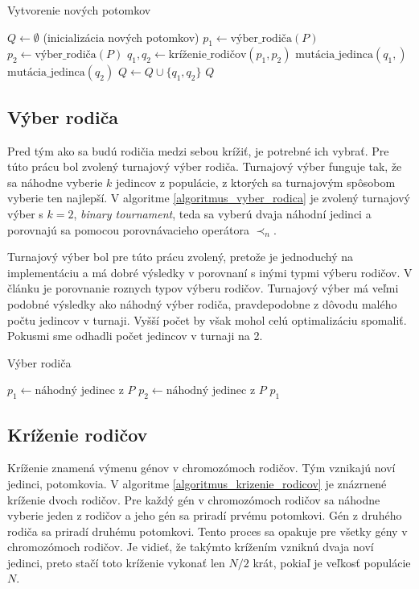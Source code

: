 \vspace*{\dimexpr 0.5\baselineskip\relax}
\begin{algorithm}[h]
\caption{Vytvorenie nových potomkov}
\label{algoritmus_vytvorenie_novych_potomkov}
  $Q \gets \emptyset$ (inicializácia nových potomkov)\;
   {
    $p_1 \gets \text{výber\_rodiča}(P)$\;
    $p_2 \gets \text{výber\_rodiča}(P)$\;
    $q_1, q_2 \gets \text{kríženie\_rodičov}(p_1, p_2)$\;
    $\text{mutácia\_jedinca}(q_1,)$\;
    $\text{mutácia\_jedinca}(q_2)$\;
    $Q \gets Q \cup \{q_1, q_2\}$\;
  }
  \Return $Q$\;
\end{algorithm}

\subsection*{Výber rodiča}
Pred tým ako sa budú rodičia medzi sebou krížiť, je potrebné ich vybrať.
Pre túto prácu bol zvolený turnajový výber rodiča.
Turnajový výber funguje tak, že sa náhodne vyberie $k$ jedincov z populácie, z ktorých sa turnajovým spôsobom vyberie ten najlepší.
V algoritme \ref{algoritmus_vyber_rodica} je zvolený turnajový výber s $k = 2$, \textit{binary tournament}, teda sa vyberú dvaja náhodní jedinci a porovnajú sa pomocou porovnávacieho operátora $\prec_n$.

Turnajový výber bol pre túto prácu zvolený, pretože je jednoduchý na implementáciu a má dobré výsledky v porovnaní s inými typmi výberu rodičov.
V článku \cite{8477847} je porovnanie roznych typov výberu rodičov.
Turnajový výber má veľmi podobné výsledky ako náhodný výber rodiča, pravdepodobne z dôvodu malého počtu jedincov v turnaji.
Vyšší počet by však mohol celú optimalizáciu spomaliť.
Pokusmi sme odhadli počet jedincov v turnaji na 2.

\vspace*{\dimexpr 0.5\baselineskip\relax}
\begin{algorithm}[h]
\caption{Výber rodiča}
\label{algoritmus_vyber_rodica}
  $p_1 \gets \text{náhodný jedinec z } P$\;
  $p_2 \gets \text{náhodný jedinec z } P$\;
   {
    \Return $p_1$\;
  }
\end{algorithm}

\subsection*{Kríženie rodičov}
Kríženie znamená výmenu génov v chromozómoch rodičov.
Tým vznikajú noví jedinci, potomkovia.
V algoritme \ref{algoritmus_krizenie_rodicov} je znázrnené kríženie dvoch rodičov.
Pre každý gén v chromozómoch rodičov sa náhodne vyberie jeden z rodičov a jeho gén sa priradí prvému potomkovi.
Gén z druhého rodiča sa priradí druhému potomkovi.
Tento proces sa opakuje pre všetky gény v chromozómoch rodičov.
Je vidieť, že takýmto krížením vzniknú dvaja noví jedinci, preto stačí toto kríženie vykonať len $N/2$ krát, pokiaľ je veľkosť populácie $N$.

